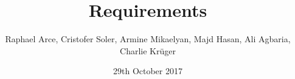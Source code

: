 \documentclass[a4paper,12pt]{scrreprt}
\title{Requirements}
\author{Raphael Arce, Cristofer Soler, Armine Mikaelyan, Majd Hasan, Ali Agbaria, Charlie Krüger}
\date{29th October 2017}
\begin{document}

\listoftodos 
\tableofcontents




\end{document}
